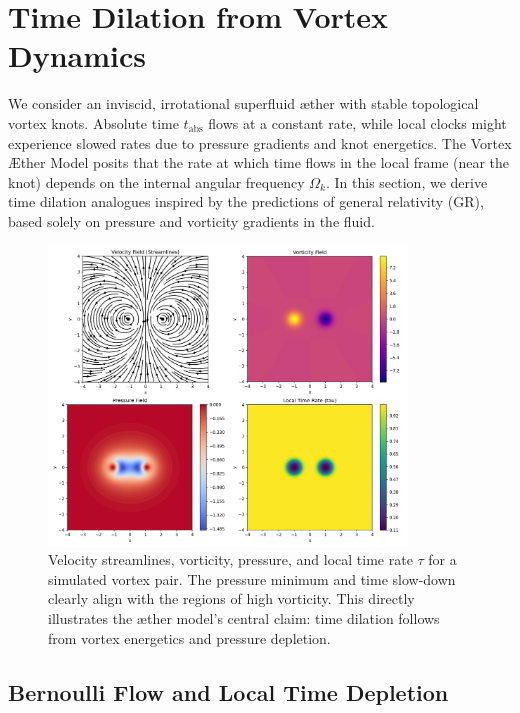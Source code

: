 \section{Time Dilation from Vortex Dynamics}\label{sec:Part-1}

    We consider an inviscid, irrotational superfluid æther with stable topological vortex knots. Absolute time $t_{\text{abs}}$ flows at a constant rate, while local clocks might experience slowed rates due to pressure gradients and knot energetics. The Vortex Æther Model posits that the rate at which time flows in the local frame (near the knot) depends on the internal angular frequency $\Omega_k$. In this section, we derive time dilation analogues inspired by the predictions of general relativity (GR), based solely on pressure and vorticity gradients in the fluid.

\begin{figure}[htbp]
    \centering
    \includegraphics[width=0.85\textwidth]{streamlinesDiPole}
    \caption{Velocity streamlines, vorticity, pressure, and local time rate $\tau$ for a simulated vortex pair. The pressure minimum and time slow-down clearly align with the regions of high vorticity. This directly illustrates the æther model's central claim: time dilation follows from vortex energetics and pressure depletion.}
    \label{fig:vortexfields}
\end{figure}

\subsection{Bernoulli Flow and Local Time Depletion}

